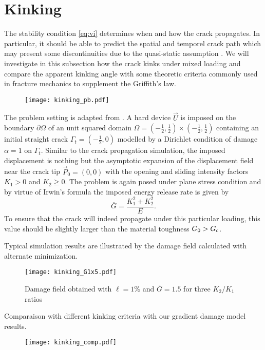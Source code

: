 \section{Kinking} \label{sec:kinking}
The stability condition \eqref{eq:vi} determines when and how the crack propagates. In particular, it should be able to predict the spatial and temporel crack path which may present some discontinuities due to the quasi-static assumption \cite{BourdinFrancfortMarigo:2008,ChambolleFrancfortMarigo:2009}. We will investigate in this subsection how the crack kinks under mixed loading and compare the apparent kinking angle with some theoretic criteria commonly used in fracture mechanics to supplement the Griffith's law.
\begin{figure}[htbp]
\centering
\texttt{[image: kinking\_pb.pdf]}
\end{figure}

The problem setting is adapted from \cite{HakimKarma:2005,HakimKarma:2009}. A hard device $\vec{U}$ is imposed on the boundary $\partial\Omega$ of an unit squared domain $\Omega=(-\frac{1}{2},\frac{1}{2})\times (-\frac{1}{2},\frac{1}{2})$ containing an initial straight crack $\Gamma_t=(-\frac{1}{2},0)$ modelled by a Dirichlet condition of damage $\alpha=1$ on $\Gamma_t$. Similar to the crack propagation simulation, the imposed displacement is nothing but the asymptotic expansion of the displacement field near the crack tip $\vec{P}_0=(0,0)$ with the opening and sliding intensity factors $K_1>0$ and $K_2\geq 0$. The problem is again posed under plane stress condition and by virtue of Irwin's formula the imposed energy release rate is given by
\[
\overline{G}=\frac{K_1^2+K_2^2}{E}.
\]
To ensure that the crack will indeed propagate under this particular loading, this value should be slightly larger than the material toughness $G_0>G_\mathrm{c}$.

Typical simulation results are illustrated by the damage field calculated with alternate minimization.
\begin{figure}[htbp]
\centering
\texttt{[image: kinking\_G1x5.pdf]}
\caption{Damage field obtained with $\ell=1\%$ and $\overline{G}=1.5$ for three $K_2/K_1$ ratios} \label{fig:kinking_k2k1}
\end{figure}

Comparaison with different kinking criteria with our gradient damage model results.
\begin{figure}[htbp]
\centering
\texttt{[image: kinking\_comp.pdf]}
\end{figure}

